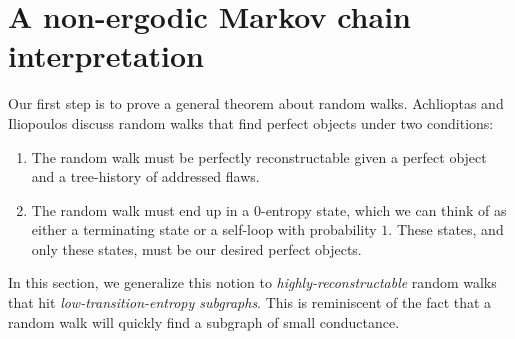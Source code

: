 \documentclass{article}
\begin{document}


\section{A non-ergodic Markov chain interpretation}
\label{sec:markov}
Our first step is to prove a general theorem about random walks.  Achlioptas and Iliopoulos discuss random walks that find perfect objects under two conditions:
\begin{enumerate}
  \item The random walk must be perfectly reconstructable given a perfect object and a tree-history of addressed flaws.
  \item The random walk must end up in a $0$-entropy state, which we can think of as either a terminating state or a self-loop with probability $1$.  These states, and only these states, must be our desired perfect objects.
\end{enumerate}
In this section, we generalize this notion to \emph{highly-reconstructable} random walks that hit \emph{low-transition-entropy subgraphs}.  This is reminiscent of the fact that a random walk will quickly find a subgraph of small conductance.
\end{document}
